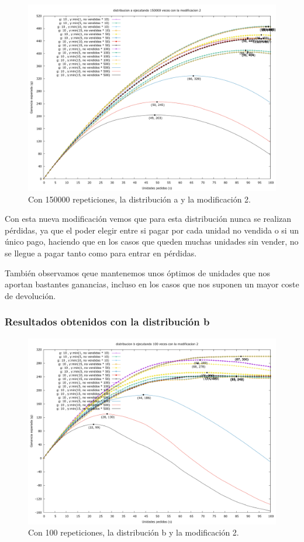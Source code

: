 \documentclass[12pt, spanish]{article}
\begin{document}
\begin{figure}[H]
	\centering
	\includegraphics[scale = 0.2]{prob_a/datos_a_150000_2.png}
	\caption{Con 150000 repeticiones, la distribución a y la modificación 2.}
	\label{fig:ej1_a_150000}

\end{figure}

Con esta nueva modificación vemos que para esta distribución nunca se realizan pérdidas, ya que el poder elegir entre si pagar por cada unidad no vendida o si un único pago, haciendo que en los casos que queden muchas unidades sin vender, no se llegue a pagar tanto como para entrar en pérdidas.

También observamos qeue mantenemos unos óptimos de unidades que nos aportan bastantes ganancias, incluso en los casos que nos suponen un mayor coste de devolución.

\subsubsection{Resultados obtenidos con la distribución b}


\begin{figure}[H]
	\centering
	\includegraphics[scale = 0.2]{prob_b/datos_b_100_2.png}
	\caption{Con 100 repeticiones, la distribución b y la modificación 2.}
	\label{fig:ej1_a_100}

\end{figure}
\end{document}
